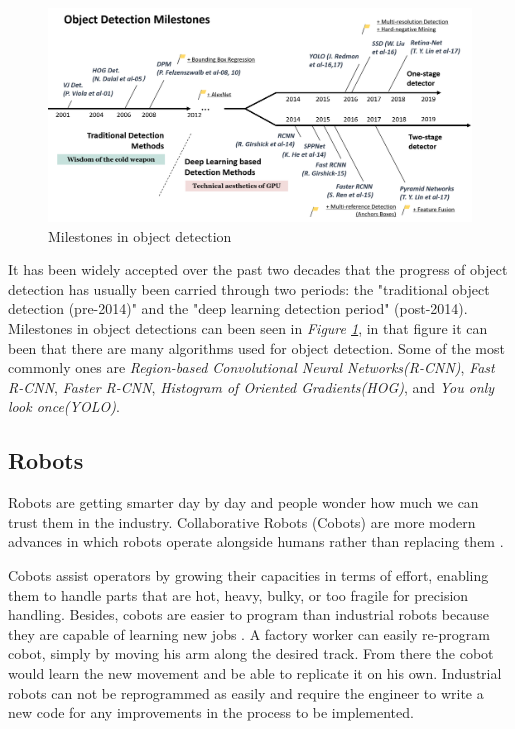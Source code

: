 \begin{figure}[h]
    \centering
    \includegraphics[width=1\textwidth]{graphics/objectdetection.png}
    \caption{Milestones in object detection}
    \label{fig:milestones}
\end{figure}
It has been widely accepted over the past two decades that the progress of object detection has usually been carried through two periods: the "traditional object detection (pre-2014)" and the "deep learning detection period" (post-2014). Milestones in object detections can been seen in \textit{Figure \ref{fig:milestones}}, in that figure it can been that there are many algorithms used for object detection. Some of the most commonly ones are \textit{Region-based Convolutional Neural Networks(R-CNN)}, \textit{Fast R-CNN}, \textit{Faster R-CNN}, \textit{Histogram of Oriented Gradients(HOG)}, and \textit{You only look once(YOLO)}.



\subsection{Robots}
Robots are getting smarter day by day and people wonder how much we can trust them in the industry. Collaborative Robots (Cobots) are more modern advances in which robots operate alongside humans rather than replacing them \cite{pickett_dont_2018}. 

Cobots assist operators by growing their capacities in terms of effort, enabling them to handle parts that are hot, heavy, bulky, or too fragile for precision handling. Besides, cobots are easier to program than industrial robots because they are capable of learning new jobs \cite{schmidbauer_teaching_2020}. A factory worker can easily re-program cobot, simply by moving his arm along the desired track. From there the cobot would learn the new movement and be able to replicate it on his own. Industrial robots can not be reprogrammed as easily and require the engineer to write a new code for any improvements in the process to be implemented.

